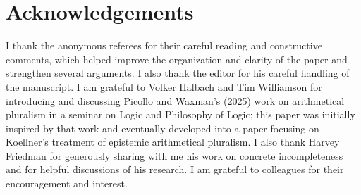 \documentclass[a4paper,12pt]{amsart}
\theoremstyle{definition}
\numberwithin{equation}{section}
\begin{document}

\section*{Acknowledgements}
I thank the anonymous referees for their careful reading and constructive comments, which helped improve the organization and clarity of the paper and strengthen several arguments. I also thank the editor for his careful handling of the manuscript. I am grateful to Volker Halbach and Tim Williamson for introducing and discussing Picollo and Waxman's (2025) work on arithmetical pluralism in a seminar on Logic and Philosophy of Logic; this paper was initially inspired by that work and eventually developed into a paper focusing on Koellner's treatment of epistemic arithmetical pluralism. I also thank Harvey Friedman for generously sharing with me his work on concrete incompleteness and for helpful discussions of his research. I am grateful to colleagues for their encouragement and interest.

%
 
\end{document}
